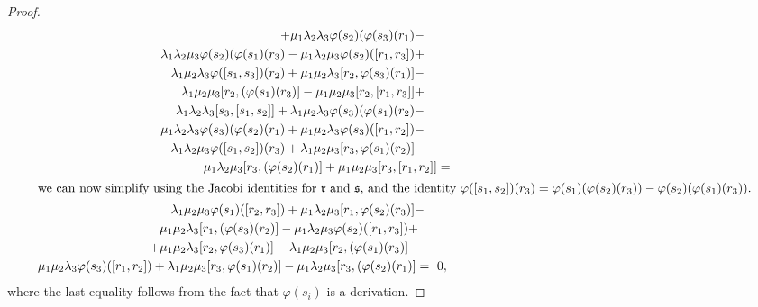 \documentclass{amsart}
\begin{document}
\begin{proof}
\begin{align*}
+ \mu_{1}\lambda_{2}\lambda_{3}\varphi(s_{2})(\varphi(s_{3})(r_{1})
- \hspace{1 em} & \\
\lambda_{1}\lambda_{2}\mu_{3}\varphi(s_{2})(\varphi(s_{1})(r_{3})
-\mu_{1}\lambda_{2}\mu_{3}\varphi(s_{2})([r_{1},r_{3}]) + \hspace{1
    em} & \\
\lambda_{1}\mu_{2}\lambda_{3}\varphi([s_{1},s_{3}])(r_{2}) 
+ \mu_{1}\mu_{2}\lambda_{3}[r_{2},\varphi(s_{3})(r_{1})]
- \hspace{1 em} & \\
\lambda_{1}\mu_{2}\mu_{3}[r_{2},(\varphi(s_{1})(r_{3})]
-\mu_{1}\mu_{2}\mu_{3}[r_{2},[r_{1},r_{3}]] + \hspace{1
    em} & \\
\lambda_{1}\lambda_{2}\lambda_{3}[s_{3},[s_{1},s_{2}]] 
+ \lambda_{1}\mu_{2}\lambda_{3}\varphi(s_{3})(\varphi(s_{1})(r_{2})
- \hspace{1 em} & \\
\mu_{1}\lambda_{2}\lambda_{3}\varphi(s_{3})(\varphi(s_{2})(r_{1})
+\mu_{1}\mu_{2}\lambda_{3}\varphi(s_{3})([r_{1},r_{2}]) - \hspace{1
    em} & \\
\lambda_{1}\lambda_{2}\mu_{3}\varphi([s_{1},s_{2}])(r_{3}) 
+ \lambda_{1}\mu_{2}\mu_{3}[r_{3},\varphi(s_{1})(r_{2})]
- \hspace{1 em} & \\
\mu_{1}\lambda_{2}\mu_{3}[r_{3},(\varphi(s_{2})(r_{1})]
+\mu_{1}\mu_{2}\mu_{3}[r_{3},[r_{1},r_{2}]] & =\\
\intertext{we can now simplify using the Jacobi identities for
    $\mathfrak{r}$ and $\mathfrak{s}$, and the identity
    $\varphi([s_{1},s_{2}])(r_{3}) =
    \varphi(s_{1})(\varphi(s_{2})(r_{3})) - \varphi(s_{2})(\varphi(s_{1})(r_{3}))$.}
\lambda_{1}\mu_{2}\mu_{3}\varphi(s_{1})([r_{2},r_{3}])  
+ \mu_{1}\lambda_{2}\mu_{3}[r_{1},\varphi(s_{2})(r_{3})]
- \hspace{1 em} & \\
\mu_{1}\mu_{2}\lambda_{3}[r_{1},(\varphi(s_{3})(r_{2})]
-\mu_{1}\lambda_{2}\mu_{3}\varphi(s_{2})([r_{1},r_{3}]) + \hspace{1.5
    em} & \\ 
+ \mu_{1}\mu_{2}\lambda_{3}[r_{2},\varphi(s_{3})(r_{1})]
- \lambda_{1}\mu_{2}\mu_{3}[r_{2},(\varphi(s_{1})(r_{3})]- \hspace{1.5
    em} & \\
\mu_{1}\mu_{2}\lambda_{3}\varphi(s_{3})([r_{1},r_{2}])
+ \lambda_{1}\mu_{2}\mu_{3}[r_{3},\varphi(s_{1})(r_{2})]
- \mu_{1}\lambda_{2}\mu_{3}[r_{3},(\varphi(s_{2})(r_{1})]
    =\textnormal{ } & 0,
\end{align*}
where the last equality follows from the fact that $\varphi(s_{i})$ is
a derivation.
\noindent
\end{proof}
\end{document}
